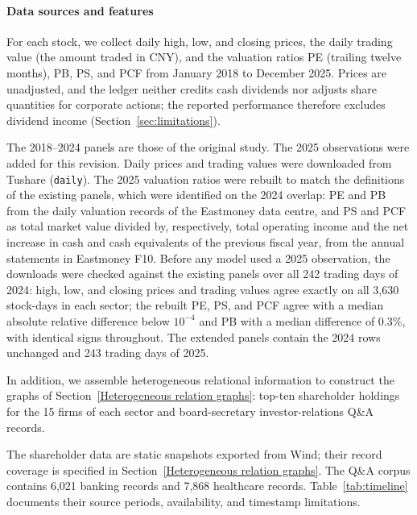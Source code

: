 \documentclass[pdflatex,sn-mathphys-num]{sn-jnl}%
\theoremstyle{thmstyleone}%
\theoremstyle{thmstyletwo}%
\theoremstyle{thmstylethree}%
\begin{document}
\paragraph{Data sources and features}
{\color{blue}For each stock, we collect daily high, low, and closing prices, the daily trading value (the amount traded in CNY), and the valuation ratios PE (trailing twelve months), PB, PS, and PCF from January 2018 to December 2025. Prices are unadjusted, and the ledger neither credits cash dividends nor adjusts share quantities for corporate actions; the reported performance therefore excludes dividend income (Section~\ref{sec:limitations}).

The 2018--2024 panels are those of the original study. The 2025 observations were added for this revision. Daily prices and trading values were downloaded from Tushare (\texttt{daily}). The 2025 valuation ratios were rebuilt to match the definitions of the existing panels, which were identified on the 2024 overlap: PE and PB from the daily valuation records of the Eastmoney data centre, and PS and PCF as total market value divided by, respectively, total operating income and the net increase in cash and cash equivalents of the previous fiscal year, from the annual statements in Eastmoney F10. Before any model used a 2025 observation, the downloads were checked against the existing panels over all 242 trading days of 2024: high, low, and closing prices and trading values agree exactly on all 3{,}630 stock-days in each sector; the rebuilt PE, PS, and PCF agree with a median absolute relative difference below $10^{-4}$ and PB with a median difference of 0.3\%, with identical signs throughout. The extended panels contain the 2024 rows unchanged and 243 trading days of 2025.\par}

In addition, we assemble heterogeneous relational information to construct the graphs of Section~\ref{Heterogeneous relation graphs}: top-ten shareholder holdings for the 15 firms of each sector and board-secretary investor-relations Q\&A records.
{\color{blue}
The shareholder data are static snapshots exported from Wind; their record coverage is specified in Section~\ref{Heterogeneous relation graphs}. The Q\&A corpus contains 6{,}021 banking records and 7{,}868 healthcare records. Table~\ref{tab:timeline} documents their source periods, availability, and timestamp limitations.
\par}
\end{document}
